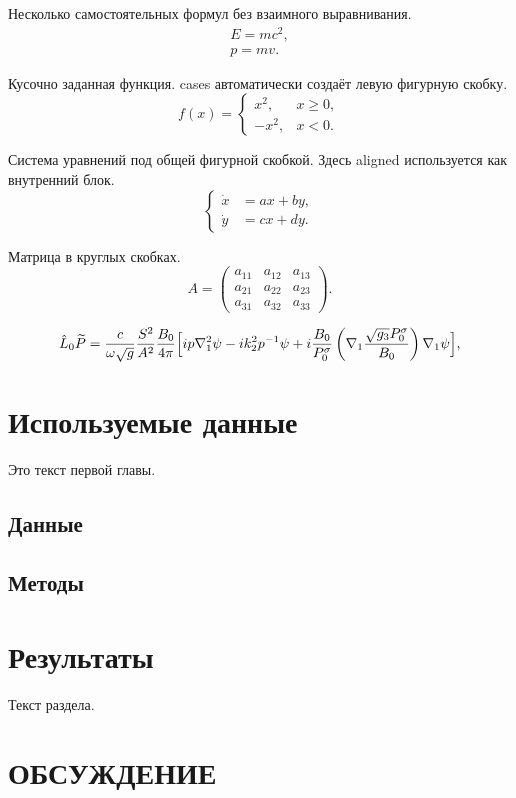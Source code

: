 \documentclass[mode=review%
]{szf}
\begin{document}
Несколько самостоятельных формул без взаимного выравнивания.
\begin{gather}
  E = mc^2,
    \label{eq:gather-a}\\
  p = mv.
    \label{eq:gather-b}
\end{gather}


Кусочно заданная функция. cases автоматически создаёт левую фигурную скобку.
\begin{equation}
  f(x) =
  \begin{cases}
    x^2,  & x \ge 0,\\
    -x^2, & x < 0.
  \end{cases}
  \label{eq:cases}
\end{equation}


Система уравнений под общей фигурной скобкой.
Здесь aligned используется как внутренний блок.
\begin{equation}
  \left\{
  \begin{aligned}
    \dot{x} &= ax + by,\\
    \dot{y} &= cx + dy.
  \end{aligned}
  \right.
  \label{eq:system}
\end{equation}


Матрица в круглых скобках.
\begin{equation}
  A =
  \begin{pmatrix}
    a_{11} & a_{12} & a_{13}\\
    a_{21} & a_{22} & a_{23}\\
    a_{31} & a_{32} & a_{33}
  \end{pmatrix}.
  \label{eq:matrix}
\end{equation}

\lipsum[1]

	\begin{wideformula}
	\begin{equation}
\hat{L}_0\widetilde{P}=\frac{c}{\omega\sqrt{g}}\frac{S^2}{A^2}\frac{B_0}{4\pi}
\Bigl[ip\nabla_1^2\psi-ik_2^2p^{-1}\psi+
i\frac{B_0}{P_0^\sigma}
\left(\nabla_1\frac{\sqrt{g_3}P_0^\sigma}{B_0}\right)
\nabla_1\psi\Bigr],
\end{equation}
	\end{wideformula}

	\lipsum[6]
	

	\section{Используемые данные}
	Это текст первой главы. \lipsum[4-5]

	\subsection{Данные}
	\lipsum[1-2]
	
	\subsection{Методы}
	\lipsum[2-3]

	\section{Результаты}

	Текст раздела. \lipsum[1-3]

	\section*{ОБСУЖДЕНИЕ}
	\lipsum[2-5]
	
\end{document}
